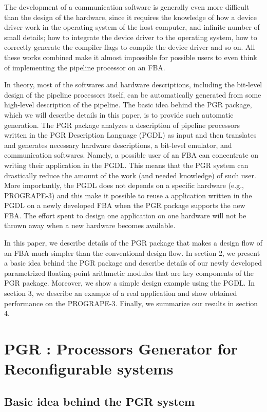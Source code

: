 \documentclass[times, 10pt,twocolumn]{article}
\begin{document}
The development of a communication software is generally even more
difficult than the design of the hardware, since it requires the
knowledge of how a device driver work in the operating
system of the host computer, and infinite number of small details;
how to integrate the device driver to the operating system, how to
correctly generate the compiler flags to compile the device driver and so on.
All these works combined make it almost impossible 
for possible users to even think of implementing the pipeline processor on an FBA.

In theory, most of the softwares and hardware descriptions,
including the bit-level design of the pipeline processors itself,
can be automatically generated from some high-level description of the
pipeline. The basic idea behind the PGR package,
which we will describe details in this paper,
is to provide such automatic generation.
The PGR package analyzes a description of pipeline processors
written in the PGR Description Language (PGDL) as input
and then translates and generates necessary hardware descriptions, 
a bit-level emulator, and communication softwares.
Namely, a possible user of an FBA can concentrate on writing their
application in the PGDL.
This means that the PGR system can drastically reduce the amount of
the work (and needed knowledge) of such user.
More importantly, the PGDL does not depends on a specific hardware
(e.g., PROGRAPE-3) and this make it possible to
reuse a application written in the PGDL on a newly developed FBA
when the PGR package supports the new FBA.
The effort spent to design one application on
one hardware will not be thrown away when a new hardware becomes available.

In this paper, we describe details of the PGR package
that makes a design flow of an FBA much simpler than
the conventional design flow.
In section 2, we present a basic idea behind the PGR package
and describe details of our newly developed parametrized 
floating-point arithmetic modules that are key components of the PGR package.
Moreover, we show a simple design example using the PGDL.
In section 3, we describe an example of a real application 
and show obtained performance on the PROGRAPE-3.
Finally, we summarize our results in section 4.

\section{PGR : Processors Generator for Reconfigurable systems}
\subsection{Basic idea behind the PGR system}
\end{document}

